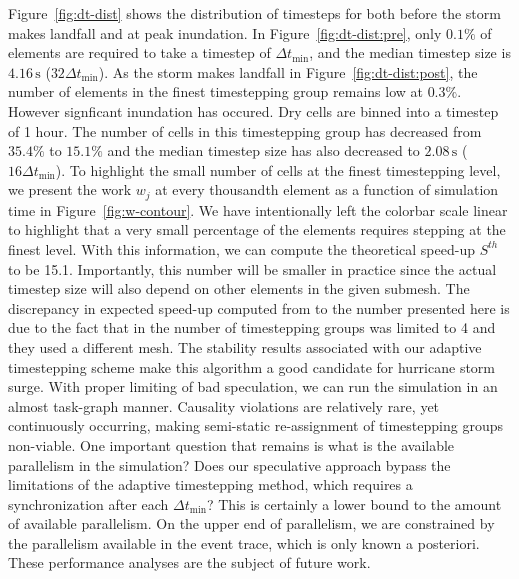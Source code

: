  Figure~\ref{fig:dt-dist} shows the distribution of timesteps for both before the storm makes landfall and at peak inundation. In Figure~\ref{fig:dt-dist:pre}, only $0.1\%$ of elements are required to take a timestep of $\Delta t_{\min}$, and the median timestep size is $4.16\,\mathrm{s}$ ($32 \Delta t_{\min}$). As the storm makes landfall in Figure~\ref{fig:dt-dist:post}, the number of elements in the finest timestepping group remains low at $0.3\%$. However signficant inundation has occured. Dry cells are binned into a timestep of 1 hour. The number of cells in this timestepping group has decreased from $35.4\%$ to $15.1\%$ and the median timestep size has also decreased to $2.08\,\mathrm{s}$ ($16 \Delta t_{\min}$). To highlight the small number of cells at the finest timestepping level, we present the work $w_j$ at every thousandth element as a function of simulation time in Figure~\ref{fig:w-contour}. We have intentionally left the colorbar scale linear to highlight that a very small percentage of the elements requires stepping at the finest level. With this information, we can compute the theoretical speed-up $S^{th}$ to be 15.1. Importantly, this number will be smaller in practice since the actual timestep size will also depend on other elements in the given submesh. The discrepancy in expected speed-up computed from \cite{Dawson2013} to the number presented here is due to the fact that in \cite{Dawson2013} the number of timestepping groups was limited to 4 and they used a different mesh. The stability results associated with our adaptive timestepping scheme make this algorithm a good candidate for hurricane storm surge. With proper limiting of bad speculation, we can run the simulation in an almost task-graph manner. Causality violations are relatively rare, yet continuously occurring, making semi-static re-assignment of timestepping groups non-viable. One important question that remains is what is the available parallelism in the simulation? Does our speculative approach bypass the limitations of the adaptive timestepping method, which requires a synchronization after each $\Delta t_{\min}$? This is certainly a lower bound to the amount of available parallelism. On the upper end of parallelism, we are constrained by the parallelism available in the event trace, which is only known a posteriori. These performance analyses are the subject of future work.


